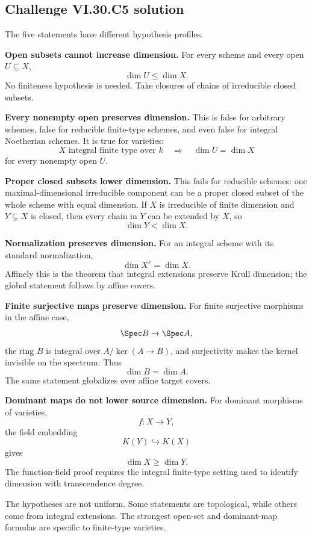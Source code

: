 \subsection*{Challenge VI.30.C5 solution}
\begin{solution}
The five statements have different hypothesis profiles.

\textbf{Open subsets cannot increase dimension.}
For every scheme and every open \(U\subseteq X\),
\[
\dim U\le\dim X.
\]
No finiteness hypothesis is needed. Take closures of chains of irreducible closed subsets.

\textbf{Every nonempty open preserves dimension.}
This is false for arbitrary schemes, false for reducible finite-type schemes, and even false for integral
Noetherian schemes. It is true for varieties:
\[
X\text{ integral finite type over }k
\quad\Longrightarrow\quad
\dim U=\dim X
\]
for every nonempty open \(U\).

\textbf{Proper closed subsets lower dimension.}
This fails for reducible schemes: one maximal-dimensional irreducible component can be a proper closed subset of
the whole scheme with equal dimension. If \(X\) is irreducible of finite dimension and
\(Y\subsetneq X\) is closed, then every chain in \(Y\) can be extended by \(X\), so
\[
\dim Y<\dim X.
\]

\textbf{Normalization preserves dimension.}
For an integral scheme with its standard normalization,
\[
\dim X^\nu=\dim X.
\]
Affinely this is the theorem that integral extensions preserve Krull dimension; the global statement follows by
affine covers.

\textbf{Finite surjective maps preserve dimension.}
For finite surjective morphisms in the affine case,
\[
\Spec B\to\Spec A,
\]
the ring \(B\) is integral over \(A/\ker(A\to B)\), and surjectivity makes the kernel invisible on the spectrum.
Thus
\[
\dim B=\dim A.
\]
The same statement globalizes over affine target covers.

\textbf{Dominant maps do not lower source dimension.}
For dominant morphisms of varieties,
\[
f:X\to Y,
\]
the field embedding
\[
K(Y)\hookrightarrow K(X)
\]
gives
\[
\dim X\ge\dim Y.
\]
The function-field proof requires the integral finite-type setting used to identify dimension with transcendence
degree.

The hypotheses are not uniform. Some statements are topological, while others come from integral extensions.
The strongest open-set and dominant-map formulas are specific to finite-type varieties.
\end{solution}
